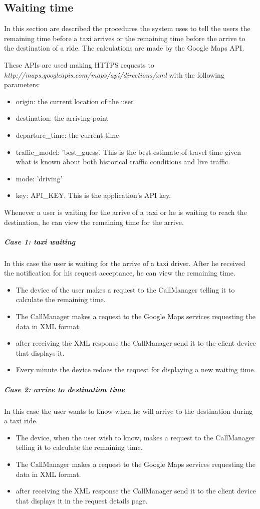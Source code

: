 \subsection{Waiting time}
In this section are described the procedures the system uses to tell the users the remaining time before a taxi arrives or the remaining time before the arrive to the destination of a ride.
The calculations are made by the Google Maps API.

These APIs are used making HTTPS requests to \newline \emph{http://maps.googleapis.com/maps/api/directions/xml}
with the following parameters:
\begin{itemize}
    \item origin: the current location of the user
    \item destination: the arriving point
    \item departure\_time: the current time
    \item traffic\_model: 'best\_guess'. This is the best estimate of travel time given what is known about both historical traffic conditions and live traffic. 
    \item mode: 'driving'
    \item key: API\_KEY. This is the application's API key.
\end{itemize}


Whenever a user is waiting for the arrive of a taxi or he is waiting to reach the destination, he can view the remaining time for the arrive.

\subparagraph{Case 1: taxi waiting}
In this case the user is waiting for the arrive of a taxi driver.
After he received the notification for his request acceptance, he can view the remaining time.
\begin{itemize}
    \item The device of the user makes a request to the CallManager telling it to calculate the remaining time.
    \item The CallManager makes a request to the Google Maps services requesting the data in XML format.
    \item after receiving the XML response the CallManager send it to the client device that displays it.
    \item Every minute the device redoes the request for displaying a new waiting time.
\end{itemize}

\subparagraph{Case 2: arrive to destination time}
In this case the user wants to know when he will arrive to the destination during a taxi ride.
\begin{itemize}
    \item The device, when the user wish to know, makes a request to the CallManager telling it to calculate the remaining time.
    \item The CallManager makes a request to the Google Maps services requesting the data in XML format.
    \item after receiving the XML response the CallManager send it to the client device that displays it in the request details page.
\end{itemize}


